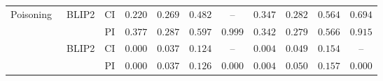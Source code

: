\documentclass[lettersize,journal]{IEEEtran}
\begin{document}
\begin{table}[t]
\begin{threeparttable}
{\begin{tabular}{llc cccc cccc}
        \multirow{2}{*}{Poisoning~\cite{carlini2022iclr-poisoning}} & \multirow{2}{*}{BLIP2}
        & CI & \(0.220\) & \(0.269\) & \(0.482\) & --
             & \(0.347\) & \(0.282\) & \(0.564\) & \(0.694\) \\
        & & PI & \(\mathbf{0.377}\) & \(0.287\) & \(\mathbf{0.597}\) & \(0.999\)
              & \(0.342\) & \(0.279\) & \(0.566\) & \(0.915\) \\
        \hdashline

        \multirow{2}{*}{BadEncoder~\cite{Jia2022BadEncoder}} & \multirow{2}{*}{BLIP2}
        & CI & \(0.000\) & \(0.037\) & \(0.124\) & --
             & \(0.004\) & \(0.049\) & \(0.154\) & -- \\
        & & PI & \(0.000\) & \(0.037\) & \(0.126\) & \(0.000\)
              & \(0.004\) & \(0.050\) & \(0.157\) & \(0.000\) \\
        \bottomrule
    \end{tabular}
    }
    \end{threeparttable}
\end{table}
\end{document}
